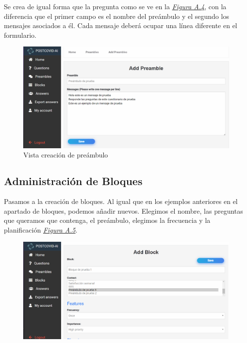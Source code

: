 Se crea de igual forma que la pregunta como se ve en la \textit{\hyperref[fig:creacion-contexto]{Figura A.4}}, con la diferencia que el primer campo es el nombre del preámbulo y el segundo los mensajes asociados a él. Cada mensaje deberá ocupar una línea diferente en el formulario. \vspace{2cm}

\begin{figure}[!ht]
    \centering
    \includegraphics[width=1\textwidth]{imagenes/creacion_preambulo.png}
    \caption{ Vista creación de preámbulo }
    \label{fig:creacion-contexto}
\end{figure}
\vspace{0.5cm}

\subsection{Administración de Bloques}

Pasamos a la creación de bloques. Al igual que en los ejemplos anteriores en el apartado de bloques, podemos añadir nuevos. Elegimos el nombre, las preguntas que queramos que contenga, el preámbulo, elegimos la frecuencia y la planificación \textit{\hyperref[fig:creacion-bloques]{Figura A.5}}. 

\vspace{0.5cm}


\begin{figure}[!ht]
    \centering
    \includegraphics[width=1\textwidth]{imagenes/creacion_bloque1.png}
    \label{fig:creacion-bloques}
\end{figure}\vspace{2cm}

